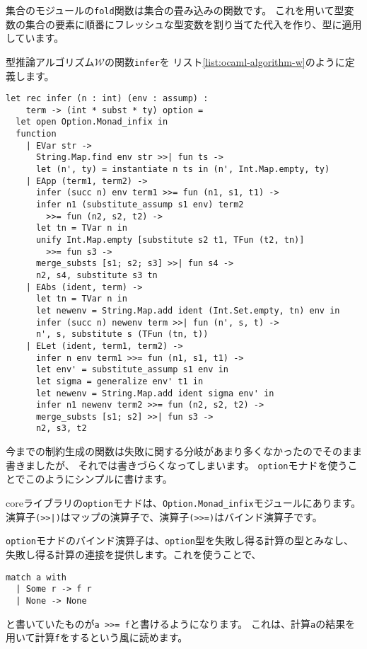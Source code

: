 集合のモジュールの\texttt{fold}関数は集合の畳み込みの関数です。
これを用いて型変数の集合の要素に順番にフレッシュな型変数を割り当てた代入を作り、型に適用しています。

型推論アルゴリズム$\mathcal W$の関数\texttt{infer}を
リスト\ref{list:ocaml-algorithm-w}のように定義します。

\begin{lstlisting}[caption=型推論アルゴリズム$\mathcal W$の実装, label=list:ocaml-algorithm-w]
let rec infer (n : int) (env : assump) :
    term -> (int * subst * ty) option =
  let open Option.Monad_infix in
  function
    | EVar str ->
      String.Map.find env str >>| fun ts ->
      let (n', ty) = instantiate n ts in (n', Int.Map.empty, ty)
    | EApp (term1, term2) ->
      infer (succ n) env term1 >>= fun (n1, s1, t1) ->
      infer n1 (substitute_assump s1 env) term2
        >>= fun (n2, s2, t2) ->
      let tn = TVar n in
      unify Int.Map.empty [substitute s2 t1, TFun (t2, tn)]
        >>= fun s3 ->
      merge_substs [s1; s2; s3] >>| fun s4 ->
      n2, s4, substitute s3 tn
    | EAbs (ident, term) ->
      let tn = TVar n in
      let newenv = String.Map.add ident (Int.Set.empty, tn) env in
      infer (succ n) newenv term >>| fun (n', s, t) ->
      n', s, substitute s (TFun (tn, t))
    | ELet (ident, term1, term2) ->
      infer n env term1 >>= fun (n1, s1, t1) ->
      let env' = substitute_assump s1 env in
      let sigma = generalize env' t1 in
      let newenv = String.Map.add ident sigma env' in
      infer n1 newenv term2 >>= fun (n2, s2, t2) ->
      merge_substs [s1; s2] >>| fun s3 ->
      n2, s3, t2
\end{lstlisting}

今までの制約生成の関数は失敗に関する分岐があまり多くなかったのでそのまま書きましたが、
それでは書きづらくなってしまいます。
\texttt{option}モナドを使うことでこのようにシンプルに書けます。

coreライブラリの\texttt{option}モナドは、\texttt{Option.Monad\_infix}モジュールにあります。
演算子\texttt{(>>|)}はマップの演算子で、演算子\texttt{(>>=)}はバインド演算子です。

\texttt{option}モナドのバインド演算子は、\texttt{option}型を失敗し得る計算の型とみなし、
失敗し得る計算の連接を提供します。これを使うことで、
\begin{lstlisting}
match a with
  | Some r -> f r
  | None -> None
\end{lstlisting}
と書いていたものが\texttt{a >>= f}と書けるようになります。
これは、計算\texttt{a}の結果を用いて計算\texttt{f}をするという風に読めます。

